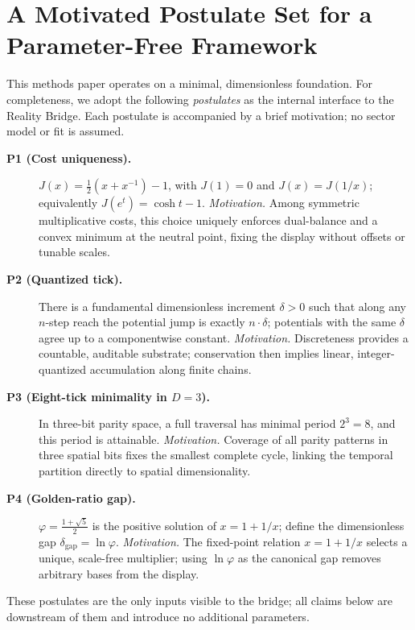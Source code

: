 \documentclass[11pt]{article}
\theoremstyle{plain}
\theoremstyle{definition}
\theoremstyle{remark}
\begin{document}
\section{A Motivated Postulate Set for a Parameter-Free Framework}
\noindent
This methods paper operates on a minimal, dimensionless foundation. For completeness, we adopt the following \emph{postulates} as the internal interface to the Reality Bridge. Each postulate is accompanied by a brief motivation; no sector model or fit is assumed.

\begin{description}
  \item[\textbf{P1 (Cost uniqueness).}] \(J(x)=\tfrac12(x+x^{-1})-1\), with \(J(1)=0\) and \(J(x)=J(1/x)\); equivalently \(J(e^{t})=\cosh t-1\).
  \emph{Motivation.} Among symmetric multiplicative costs, this choice uniquely enforces dual-balance and a convex minimum at the neutral point, fixing the display without offsets or tunable scales.

  \item[\textbf{P2 (Quantized tick).}] There is a fundamental dimensionless increment \(\delta>0\) such that along any \(n\)-step reach the potential jump is exactly \(n\cdot\delta\); potentials with the same \(\delta\) agree up to a componentwise constant.
  \emph{Motivation.} Discreteness provides a countable, auditable substrate; conservation then implies linear, integer-quantized accumulation along finite chains.

  \item[\textbf{P3 (Eight-tick minimality in \(D=3\)).}] In three-bit parity space, a full traversal has minimal period \(2^{3}=8\), and this period is attainable.
  \emph{Motivation.} Coverage of all parity patterns in three spatial bits fixes the smallest complete cycle, linking the temporal partition directly to spatial dimensionality.

  \item[\textbf{P4 (Golden-ratio gap).}] \(\varphi=\tfrac{1+\sqrt5}{2}\) is the positive solution of \(x=1+1/x\); define the dimensionless gap \(\delta_{\mathrm{gap}}=\ln\varphi\).
  \emph{Motivation.} The fixed-point relation \(x=1+1/x\) selects a unique, scale-free multiplier; using \(\ln\varphi\) as the canonical gap removes arbitrary bases from the display.
\end{description}

\noindent These postulates are the only inputs visible to the bridge; all claims below are downstream of them and introduce no additional parameters.
\end{document}
